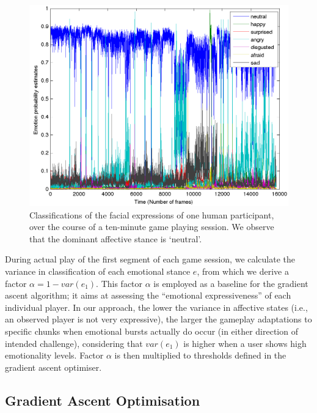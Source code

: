 \documentclass[letterpaper]{article}
\begin{document}
\begin{figure}[t]
	\includegraphics[width=1.00\columnwidth]{images/paris/allEmotions.png}
	\caption{Classifications of the facial expressions of one human participant, over the course of a ten-minute game playing session. We observe that the dominant affective stance is `neutral'.}
	\label{fig:emotions10seg}
\end{figure}

During actual play of the first segment of each game session, we calculate the variance in classification of each emotional stance $e$, from which we derive a factor $\alpha = 1 - var(e_1)$. This factor $\alpha$ is employed as a baseline for the gradient ascent algorithm; it aims at assessing the ``emotional expressiveness'' of each individual player. In our approach, the lower the variance in affective states (i.e., an observed player is not very expressive), the larger the gameplay adaptations to specific chunks when emotional bursts actually do occur (in either direction of intended challenge), considering that $var(e_1)$ is higher when a user shows high emotionality levels. Factor $\alpha$ is then multiplied to thresholds defined in the gradient ascent optimiser.

\subsection{Gradient Ascent Optimisation}
\end{document}
